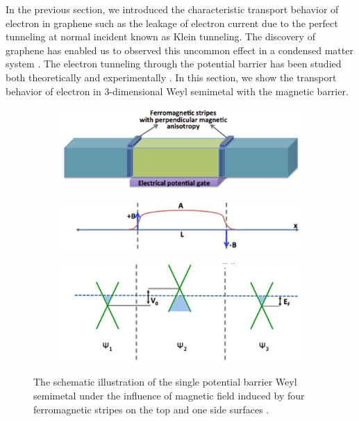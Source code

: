     In the previous section, we introduced the characteristic transport behavior of electron in graphene such as the leakage of electron current due to the perfect tunneling at normal incident known as Klein tunneling.
    The discovery of graphene has enabled us to observed this uncommon effect in a condensed matter system \cite{Zhang2004}.
    The electron tunneling through the potential barrier has been studied both theoretically and experimentally \cite{Katsnelson2006a,Rahman2015,Allain2011}.
    In this section, we show the transport behavior of electron in 3-dimensional Weyl semimetal with the magnetic barrier.
    \begin{figure}[H]
        \centering
        \begin{subfigure}[b]{0.6\linewidth}
            \includegraphics[width = \linewidth]{fig/Chap 2/2weyl structure.png}
            \caption{}
            \label{2fig:weyl structure}
        \end{subfigure}
        \begin{subfigure}[b]{0.6\linewidth}
            \includegraphics[width = \linewidth]{fig/Chap 2/B field profile.png}
            \caption{}
            \label{2fig:b field profile}
        \end{subfigure}
        \begin{subfigure}[b]{0.6\linewidth}
            \includegraphics[width = \linewidth]{fig/Chap 2/three weyl cones.png}
            \caption{}
            \label{2fig:3 weyl cones}
        \end{subfigure}
        \caption{The schematic illustration of the single potential barrier Weyl semimetal under the influence of magnetic field 
                    induced by four ferromagnetic stripes on the top and one side surfaces \cite{Yesilyurt2016b}.}
        \label{2fig:weyl npn}
    \end{figure}
